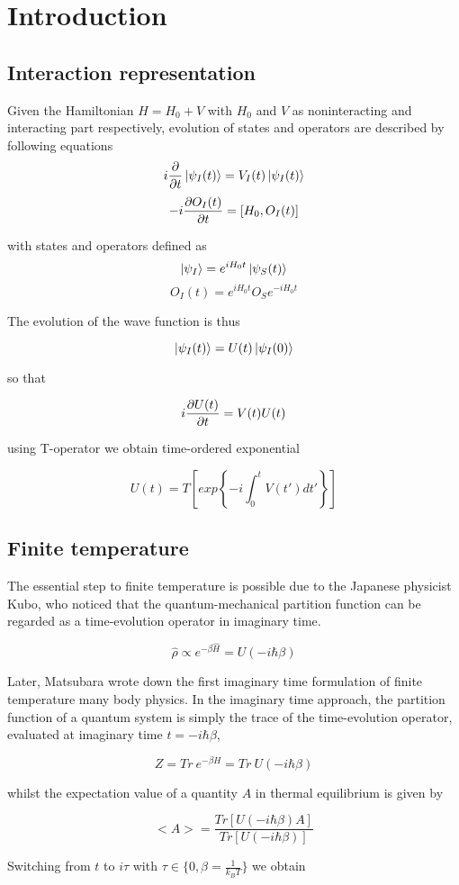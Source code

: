 \section{Introduction}
\subsection{Interaction representation}

Given the Hamiltonian $H=H_0+V$ with $H_0$ and $V$ as noninteracting and interacting part respectively,
evolution of states and operators are described by following equations
\[ i\frac{\partial }{\partial t}\ket{\psi_I(t)}=V_I(t)\ket{\psi_I(t)} \]
\[ -i\frac{\partial O_I(t)}{\partial t}=\left[H_0,O_I(t)\right] \]

with states and operators defined as
\[ \ket{\psi_I} = e^{i H_0 t}\ket{\psi_S(t)} \]
\[ O_I(t) = e^{i H_0 t} O_S e^{-i H_0 t} \] 

The evolution of the wave function is thus

\[ \ket{\psi_I(t)} = U(t) \ket{\psi_I(0)} \]

so that

\[ i\frac{\partial U(t)}{\partial t} = V(t) U(t) \]

using T-operator we obtain time-ordered exponential

\[ U(t) = T\left[exp\left\{-i\int_{0}^{t}V(t')dt'\right\}\right] \]

\subsection{Finite temperature}
The essential step to finite temperature is possible due to the Japanese physicist Kubo, who noticed
that the quantum-mechanical partition function can be regarded as a time-evolution operator in imaginary time.

\[ \hat{\rho} \propto e^{-\beta \hat{H}} = U(-i\hbar\beta) \]

Later, Matsubara wrote down the first imaginary time formulation of finite temperature many body physics.
In the imaginary time approach, the partition function of a quantum system is simply the trace 
of the time-evolution operator, evaluated at imaginary time $t = -i\hbar\beta$,

\[ Z = Tr\ e^{-\beta H} = Tr\ U(-i\hbar\beta)\]

whilst the expectation value of a quantity $A$ in thermal equilibrium is given by

\[ <A> = \frac{Tr[U(-i\hbar\beta)A]}{Tr[U(-i\hbar\beta)]} \]

Switching from $t$ to $i\tau$ with $\tau\in\{0,\beta=\frac{1}{k_B T}\}$ we obtain

